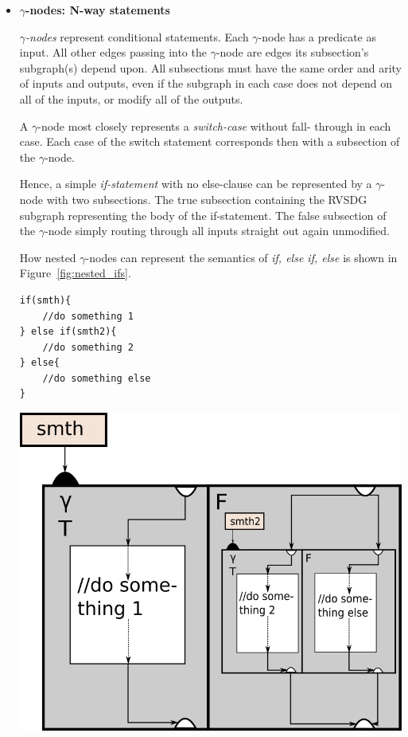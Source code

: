 \begin{itemize}

\item \textbf{$\gamma$-nodes: N-way statements}

\textit{$\gamma$-nodes} represent conditional statements. Each $\gamma$-node has
a predicate as input. All other edges passing into the $\gamma$-node are edges
its subsection's subgraph(s) depend upon. All subsections must have the same
order and arity of inputs and outputs, even if the subgraph in each case does
not depend on all of the inputs, or modify all of the outputs.

A $\gamma$-node most closely represents a \textit{switch-case} without fall-
through in each case. Each case of the switch statement corresponds then with a
subsection of the $\gamma$-node.

Hence, a simple \textit{if-statement} with no else-clause can be represented by
a $\gamma$-node with two subsections. The true subsection containing the RVSDG
subgraph representing the body of the if-statement. The false subsection of the
$\gamma$-node simply routing through all inputs straight out again unmodified.

How nested $\gamma$-nodes can represent the semantics of \textit{if, else if,
else} is shown in Figure~\ref{fig:nested_ifs}.

\begin{centering}
	\noindent\begin{minipage}{0.36\textwidth}
		\begin{lstlisting}[label={lst:nested_ifs}, style=customcpp]
if(smth){
	//do something 1
} else if(smth2){
	//do something 2
} else{
	//do something else
}
		\end{lstlisting}
	\end{minipage}
	\noindent\begin{minipage}{0.55\textwidth}
		\captionsetup{type=figure}
		\includegraphics[width=\textwidth]{figures/if_elseif_else_example}
	\end{minipage}
	\label{fig:nested_ifs}
\end{centering}


\end{itemize}

